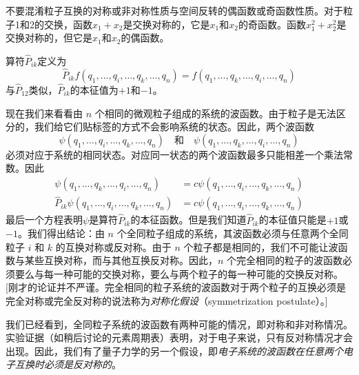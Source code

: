     不要混淆粒子互换的对称或非对称性质与空间反转的偶函数或奇函数性质。对于粒子1和2的交换，函数$x_1 + x_2$是交换对称的，它是$x_1$和$x_2$的奇函数。函数$x_1^2 + x_2^2$是交换对称的，但它是$x_1$和$x_2$的偶函数。

    算符$\hat{P}_{ik}$定义为
    \begin{equation}
        \hat{P}_{ik} f \left(q_1, \ldots, q_i, \ldots, q_k, \ldots, q_n\right) = f \left(q_1, \ldots, q_k, \ldots, q_i, \ldots, q_n\right)
        \label{eq:10.18}
    \end{equation}
    与$\hat{P}_{12}$类似，$\hat{P}_{ik}$的本征值为$+1$和$-1$。

    现在我们来看看由 $n$ 个相同的微观粒子组成的系统的波函数。由于粒子是无法区分的，我们给它们贴标签的方式不会影响系统的状态。因此，两个波函数
    \begin{equation*}
        \psi\left(q_1, \ldots, q_i, \ldots, q_k, \ldots, q_n\right) \quad \text{和} \quad \psi\left(q_1, \ldots, q_k, \ldots, q_i, \ldots, q_n\right)
    \end{equation*}
    必须对应于系统的相同状态。对应同一状态的两个波函数最多只能相差一个乘法常数。因此
    \begin{equation*}
        \begin{aligned}
            \psi\left(q_1, \ldots, q_k, \ldots, q_i, \ldots, q_n\right) &= c \psi\left(q_1, \ldots, q_i, \ldots, q_k, \ldots, q_n\right) \\
            \hat{P}_{ik} \psi\left(q_1, \ldots, q_i, \ldots, q_k, \ldots, q_n\right) &= c \psi\left(q_1, \ldots, q_i, \ldots, q_k, \ldots, q_n\right)
        \end{aligned}
    \end{equation*}
    最后一个方程表明$\psi$是算符$\hat{P}_{ik}$的本征函数。但是我们知道$\hat{P}_{ik}$的本征值只能是$+1$或$-1$。我们得出结论：由 $n$ 个全同粒子组成的系统，其波函数必须与任意两个全同粒子 $i$ 和 $k$ 的互换对称或反对称。由于 $n$ 个粒子都是相同的，我们不可能让波函数与某些互换对称，而与其他互换反对称。因此，$n$ 个完全相同的粒子的波函数必须要么与每一种可能的交换对称，要么与两个粒子的每一种可能的交换反对称。[刚才的论证并不严谨。完全相同的粒子系统的波函数对于两个粒子的互换必须是完全对称或完全反对称的说法称为\textit{对称化假设}（symmetrization postulate）。]

    我们已经看到，全同粒子系统的波函数有两种可能的情况，即对称和非对称情况。实验证据（如稍后讨论的元素周期表）表明，对于电子来说，只有反对称情况才会出现。因此，我们有了量子力学的另一个假设，即\textit{电子系统的波函数在任意两个电子互换时必须是反对称的}。

